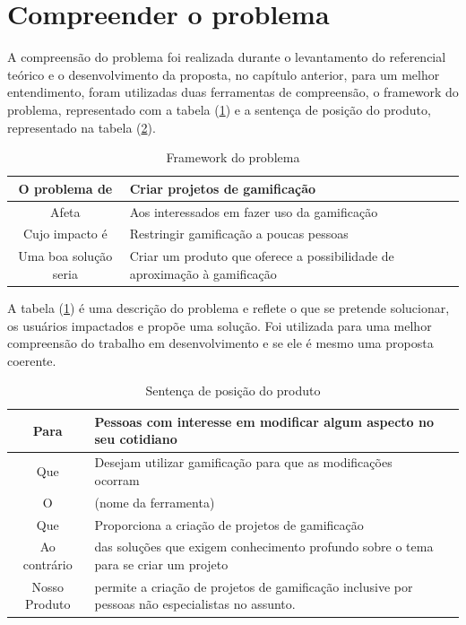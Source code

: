 \newpage

\section {Compreender o problema}

A compreensão do problema foi realizada durante o levantamento do referencial teórico e o desenvolvimento da proposta, no capítulo anterior, para um melhor entendimento, foram utilizadas duas ferramentas de compreensão, o framework do problema, representado com a tabela (\ref{tab02}) e a sentença de posição do produto, representado na tabela (\ref{tab03}).


\begin{table}[!htpb]
\centering
\begin{tabular}{|c|p{6cm}|p{12cm}|} \hline

 O problema de & Criar projetos de gamificação\\ \hline

 Afeta & Aos interessados em fazer uso da gamificação \\ \hline

 Cujo impacto é & Restringir gamificação a poucas pessoas \\ \hline

 Uma boa solução seria & Criar um produto que oferece a possibilidade de aproximação à gamificação \\ \hline

\end{tabular}
\caption{Framework do problema\label{tab02}
}
\end{table} 


A tabela (\ref{tab02}) é uma descrição do problema e reflete o que se pretende solucionar, os usuários impactados e propõe uma solução. Foi utilizada para uma melhor compreensão do trabalho em desenvolvimento e se ele é mesmo uma proposta coerente.

\begin{table}[!htpb]
\centering
\begin{tabular}{|c|p{6cm}|p{15cm}|} \hline

 Para  & Pessoas com interesse em modificar algum aspecto no seu cotidiano \\ \hline

 Que & Desejam utilizar gamificação para que as modificações ocorram \\ \hline

 O  & (nome da ferramenta) \\ \hline

 Que & Proporciona a criação de projetos de gamificação \\ \hline

 Ao contrário  & das soluções que exigem conhecimento profundo sobre o tema para se criar um projeto \\ \hline

 Nosso Produto & permite a criação de projetos de gamificação inclusive por pessoas não especialistas no assunto. \\ \hline

\end{tabular}
\caption{Sentença de posição do produto\label{tab03}
}
\end{table} 



